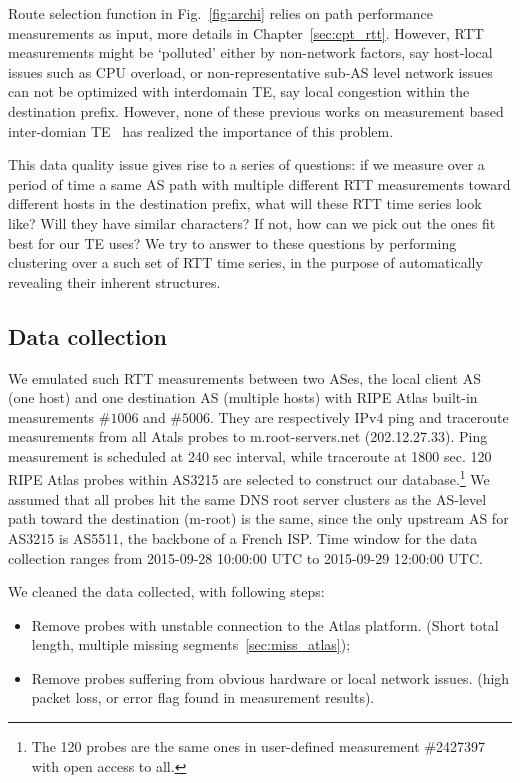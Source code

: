 Route selection function in Fig.~\ref{fig:archi} relies on path performance measurements as input, more details in Chapter~\ref{sec:cpt_rtt}.
However, RTT measurements might be `polluted' either by non-network factors, say host-local issues such as CPU overload, or non-representative sub-AS level network issues can not be optimized with interdomain TE, say local congestion within the destination prefix.
However, none of these previous works on measurement based inter-domian TE~\cite{Goldenberg2004, Akella2008} has realized the importance of this problem.

This data quality issue gives rise to a series of questions: if we measure over a period of time a same AS path with multiple different RTT measurements toward different hosts in the destination prefix, what will these RTT time series look like? Will they have similar characters? If not, how can we pick out the ones fit best for our TE uses?
We try to answer to these questions by performing clustering over a such set of RTT time series, in the purpose of automatically revealing their inherent structures.

\subsection{Data collection}
We emulated such RTT measurements between two ASes, the local client AS (one host) and one destination AS (multiple hosts) with RIPE Atlas built-in measurements $\#1006$ and $\#5006$.
They are respectively IPv4 ping and traceroute measurements from all Atals probes to m.root-servers.net (202.12.27.33). 
Ping measurement is scheduled at 240 sec interval, while traceroute at 1800 sec.
120 RIPE Atlas probes within AS3215 are selected to construct our database.\footnote{The 120 probes are the same ones in user-defined measurement \#2427397 with open access to all.}
We assumed that all probes hit the same DNS root server clusters as the AS-level path toward the destination (m-root) is the same, since the only upstream AS for AS3215 is AS5511, the backbone of a French \ac{ISP}. Time window for the data collection ranges from 2015-09-28 10:00:00 UTC to 2015-09-29 12:00:00 UTC.

We cleaned the data collected, with following steps:
\begin{itemize}
\item Remove probes with unstable connection to the Atlas platform. (Short total length, multiple missing segments~\ref{sec:miss_atlas});
\item Remove probes suffering from obvious hardware or local network issues. (high packet loss, or error flag found in measurement results).
\end{itemize}

